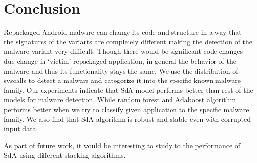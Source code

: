 \chapter{Conclusion}
\thispagestyle{plain}

\label{Conclusion}

Repackaged Android malware can change its code and structure in a way that the signatures of the variants are completely different making the detection of the malware variant very difficult. Though there would be significant code changes due change in ‘victim’ repackaged application, in general the behavior of the malware and thus its functionality stays the same. We use the distribution of syscalls to detect a malware and categorize it into the specific known malware family. Our experiments indicate that SdA model performs better than rest of the models for malware detection. While random forest and Adaboost algorithm performs better when we try to classify given application to the specific malware family. We also find that SdA algorithm is robust and stable even with corrupted input data.

As part of future work, it would be interesting to study to the performance of SdA using different stacking algorithms.
